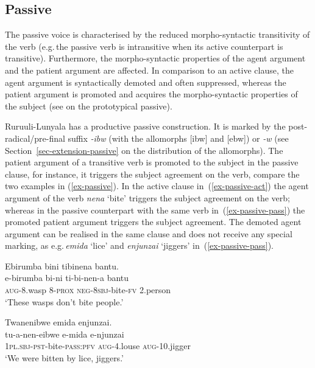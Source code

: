 \subsection{Passive}\label{sec-passive}
\largerpage
The passive voice is characterised by the reduced morpho-syn\-tac\-tic transitivity of the verb (e.g.\,the passive verb is intransitive when its active counterpart is transitive). 
Furthermore, the morpho-syntactic properties of the agent argument and the patient argument are affected. 
In comparison to an active clause, the agent argument is syntactically demoted and often suppressed, whereas the patient argument is promoted and acquires the morpho-syntactic properties of the subject 
(see \citealt[83–84]{Zunigaetal2019Grammatical} on the prototypical passive). 

Ruruuli-Lunyala has a productive passive construction. 
It is marked by the post-radical/pre-final suffix \emph{-ibw} (with the allomorphs [ibw] and [ebw]) or \emph{-w} (see Section~\ref{sec-extension-passive} on the distribution of the allomorphs). 
The patient argument of a transitive verb is promoted to the subject in the passive clause, 
for instance, it triggers the subject agreement on the verb, compare the two examples in (\ref{ex-passive}). 
In the active clause in~(\ref{ex-passive-act}) the agent argument of the verb \emph{nena} `bite' triggers the subject agreement on the verb; whereas in the passive counterpart with the same verb in~(\ref{ex-passive-pass}) the promoted patient argument triggers the subject agreement. 
The demoted agent argument can be realised in the same clause and does not receive any special marking, as e.g.\,\emph{emida} `lice' and \emph{enjunzai} `jiggers' in~(\ref{ex-passive-pass}).

\ea \label{ex-passive}
\begin{xlist}
	\ex \label{ex-passive-act}
	\glll Ebirumba bini tibinena bantu.\\
	  e-birumba bi-ni ti-bi-nen-a bantu\\
		\textsc{aug}-8.wasp 8-\textsc{prox} \textsc{neg}-\textsc{8sbj}-bite-\textsc{fv} 2.person\\
	\glt ‘These wasps don't bite people.’ 

	\ex \label{ex-passive-pass}
	\glll Twanenibwe emida enjunzai.\\
	  tu-a-nen-eibwe e-mida e-njunzai\\
		1\textsc{pl.sbj}-\textsc{pst}-bite-\textsc{pass}:\textsc{pfv} \textsc{aug}-4.louse \textsc{aug}-10.jigger\\
	\glt ‘We were bitten by lice, jiggers.’ 
\end{xlist}
\z


